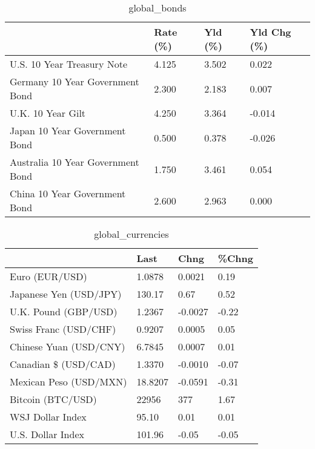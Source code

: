 \documentclass{article}%
\begin{document}
%


\begin{table}[htbp]%
\caption{global\_bonds}%
\centering%
\begin{adjustbox}{width=1\textwidth}%
\begin{tabular}{llll}
\toprule
                                  & Rate (\%) & Yld (\%) & Yld Chg (\%) \\
\midrule
       U.S. 10 Year Treasury Note &    4.125 &   3.502 &       0.022 \\
  Germany 10 Year Government Bond &    2.300 &   2.183 &       0.007 \\
                U.K. 10 Year Gilt &    4.250 &   3.364 &      -0.014 \\
    Japan 10 Year Government Bond &    0.500 &   0.378 &      -0.026 \\
Australia 10 Year Government Bond &    1.750 &   3.461 &       0.054 \\
    China 10 Year Government Bond &    2.600 &   2.963 &       0.000 \\
\bottomrule
\end{tabular}
%
\end{adjustbox}%
\end{table}

%


\begin{table}[htbp]%
\caption{global\_currencies}%
\centering%
\begin{adjustbox}{width=1\textwidth}%
\begin{tabular}{llll}
\toprule
                       &    Last &    Chng & \%Chng \\
\midrule
        Euro (EUR/USD) &  1.0878 &  0.0021 &  0.19 \\
Japanese Yen (USD/JPY) &  130.17 &    0.67 &  0.52 \\
  U.K. Pound (GBP/USD) &  1.2367 & -0.0027 & -0.22 \\
 Swiss Franc (USD/CHF) &  0.9207 &  0.0005 &  0.05 \\
Chinese Yuan (USD/CNY) &  6.7845 &  0.0007 &  0.01 \\
  Canadian \$ (USD/CAD) &  1.3370 & -0.0010 & -0.07 \\
Mexican Peso (USD/MXN) & 18.8207 & -0.0591 & -0.31 \\
     Bitcoin (BTC/USD) &   22956 &     377 &  1.67 \\
      WSJ Dollar Index &   95.10 &    0.01 &  0.01 \\
     U.S. Dollar Index &  101.96 &   -0.05 & -0.05 \\
\bottomrule
\end{tabular}
%
\end{adjustbox}%
\end{table}
\end{document}
